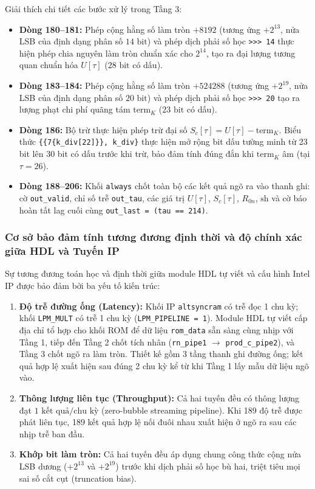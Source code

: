 Giải thích chi tiết các bước xử lý trong Tầng 3:
\begin{itemize}[leftmargin=1.5em, itemsep=2pt]
    \item \textbf{Dòng 180--181:} Phép cộng hằng số làm tròn $+ 8192$ (tương ứng $+ 2^{13}$, nửa LSB của định dạng phân số $14\text{ bit}$) và phép dịch phải số học \texttt{>>> 14} thực hiện phép chia nguyên làm tròn chuẩn xác cho $2^{14}$, tạo ra đại lượng tương quan chuẩn hóa $U[\tau]$ ($28\text{ bit}$ có dấu).
    \item \textbf{Dòng 183--184:} Phép cộng hằng số làm tròn $+ 524288$ (tương ứng $+ 2^{19}$, nửa LSB của định dạng phân số $20\text{ bit}$) và phép dịch phải số học \texttt{>>> 20} tạo ra lượng phạt chi phí quãng tám $\text{term}_K$ ($23\text{ bit}$ có dấu).
    \item \textbf{Dòng 186:} Bộ trừ thực hiện phép trừ đại số $S_c[\tau] = U[\tau] - \text{term}_K$. Biểu thức \texttt{\{\{7\{k\_div[22]\}\}, k\_div\}} thực hiện mở rộng bit dấu tường minh từ 23 bit lên 30 bit có dấu trước khi trừ, bảo đảm tính đúng đắn khi $\text{term}_K$ âm (tại $\tau = 26$).
    \item \textbf{Dòng 188--206:} Khối \texttt{always} chốt toàn bộ các kết quả ngõ ra vào thanh ghi: cờ \texttt{out\_valid}, chỉ số trễ \texttt{out\_tau}, các giá trị $U[\tau]$, $S_c[\tau]$, $R_{0n}$, $\text{sh}$ và cờ báo hoàn tất lag cuối cùng \texttt{out\_last = (tau == 214)}.
\end{itemize}

\subsubsection*{Cơ sở bảo đảm tính tương đương định thời và độ chính xác giữa HDL và Tuyến IP}
Sự tương đương toán học và định thời giữa module HDL tự viết và cấu hình Intel IP được bảo đảm bởi ba yếu tố kiến trúc:
\begin{enumerate}[leftmargin=1.5em, itemsep=2pt]
    \item \textbf{Độ trễ đường ống (Latency):} Khối IP \texttt{altsyncram} có trễ đọc 1 chu kỳ; khối \texttt{LPM\_MULT} có trễ 1 chu kỳ (\texttt{LPM\_PIPELINE = 1}). Module HDL tự viết cấp địa chỉ tổ hợp cho khối ROM để dữ liệu \texttt{rom\_data} sẵn sàng cùng nhịp với Tầng 1, tiếp đến Tầng 2 chốt tích nhân (\texttt{rn\_pipe1} $\to$ \texttt{prod\_c\_pipe2}), và Tầng 3 chốt ngõ ra làm tròn. Thiết kế gồm 3 tầng thanh ghi đường ống; kết quả hợp lệ xuất hiện sau đúng 2 chu kỳ kể từ khi Tầng 1 lấy mẫu dữ liệu ngõ vào.
    \item \textbf{Thông lượng liên tục (Throughput):} Cả hai tuyến đều có thông lượng đạt $1\text{ kết quả/chu kỳ}$ (zero-bubble streaming pipeline). Khi 189 độ trễ được phát liên tục, 189 kết quả hợp lệ nối đuôi nhau xuất hiện ở ngõ ra sau các nhịp trễ ban đầu.
    \item \textbf{Khớp bit làm tròn:} Cả hai tuyến đều áp dụng chung công thức cộng nửa LSB dương ($+ 2^{13}$ và $+ 2^{19}$) trước khi dịch phải số học bù hai, triệt tiêu mọi sai số cắt cụt (truncation bias).
\end{enumerate}

